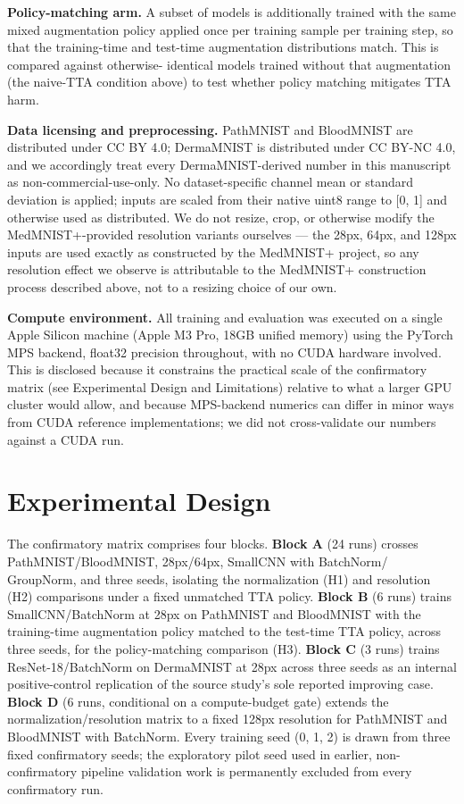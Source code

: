 \textbf{Policy-matching arm.} A subset of models is additionally trained with the same mixed augmentation policy applied once per training sample per training step, so that the training-time and test-time augmentation distributions match. This is compared against otherwise- identical models trained without that augmentation (the naive-TTA condition above) to test whether policy matching mitigates TTA harm.

\textbf{Data licensing and preprocessing.} PathMNIST and BloodMNIST are distributed under CC BY 4.0; DermaMNIST is distributed under CC BY-NC 4.0, and we accordingly treat every DermaMNIST-derived number in this manuscript as non-commercial-use-only. No dataset-specific channel mean or standard deviation is applied; inputs are scaled from their native uint8 range to [0, 1] and otherwise used as distributed. We do not resize, crop, or otherwise modify the MedMNIST+-provided resolution variants ourselves --- the 28px, 64px, and 128px inputs are used exactly as constructed by the MedMNIST+ project, so any resolution effect we observe is attributable to the MedMNIST+ construction process described above, not to a resizing choice of our own.

\textbf{Compute environment.} All training and evaluation was executed on a single Apple Silicon machine (Apple M3 Pro, 18GB unified memory) using the PyTorch MPS backend, float32 precision throughout, with no CUDA hardware involved. This is disclosed because it constrains the practical scale of the confirmatory matrix (see Experimental Design and Limitations) relative to what a larger GPU cluster would allow, and because MPS-backend numerics can differ in minor ways from CUDA reference implementations; we did not cross-validate our numbers against a CUDA run.

\section{Experimental Design}

The confirmatory matrix comprises four blocks. \textbf{Block A} (24 runs) crosses PathMNIST/BloodMNIST, 28px/64px, SmallCNN with BatchNorm/ GroupNorm, and three seeds, isolating the normalization (H1) and resolution (H2) comparisons under a fixed unmatched TTA policy. \textbf{Block B} (6 runs) trains SmallCNN/BatchNorm at 28px on PathMNIST and BloodMNIST with the training-time augmentation policy matched to the test-time TTA policy, across three seeds, for the policy-matching comparison (H3). \textbf{Block C} (3 runs) trains ResNet-18/BatchNorm on DermaMNIST at 28px across three seeds as an internal positive-control replication of the source study's sole reported improving case. \textbf{Block D} (6 runs, conditional on a compute-budget gate) extends the normalization/resolution matrix to a fixed 128px resolution for PathMNIST and BloodMNIST with BatchNorm. Every training seed (0, 1, 2) is drawn from three fixed confirmatory seeds; the exploratory pilot seed used in earlier, non-confirmatory pipeline validation work is permanently excluded from every confirmatory run.

